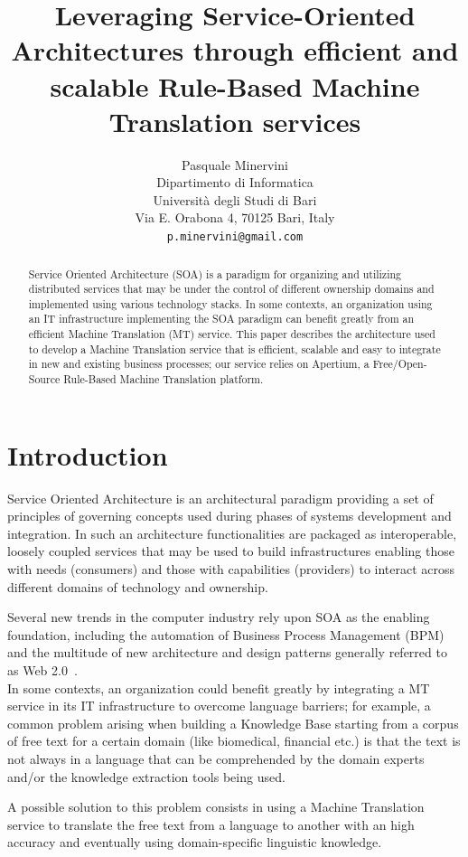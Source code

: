 \documentclass[11pt]{article}
\title{Leveraging Service-Oriented Architectures through efficient and scalable Rule-Based Machine Translation services}
\author{Pasquale Minervini\\
  Dipartimento di Informatica\\
  Università degli Studi di Bari\\
  Via E. Orabona 4, 70125 Bari, Italy\\
  {\tt p.minervini@gmail.com}}
\date{}
\begin{document}
\maketitle

\begin{abstract}
Service Oriented Architecture (SOA) is a paradigm for organizing and utilizing distributed services that may be under the  control of different ownership domains and implemented using various technology stacks. In some contexts, an organization using an IT infrastructure implementing the SOA paradigm can benefit greatly from an efficient Machine Translation (MT) service. This paper describes the architecture used to develop a Machine Translation service that is efficient, scalable and easy to integrate in new and existing business processes; our service relies on Apertium, a Free/Open-Source Rule-Based Machine Translation platform.
\end{abstract}


\section{Introduction}

Service Oriented Architecture is an architectural paradigm providing  a set of principles of governing concepts used during phases of systems development and integration. In such an architecture functionalities are packaged as interoperable, loosely coupled services that may be used to build infrastructures enabling those with needs (consumers) and those with capabilities (providers) to interact across different domains of technology and ownership.

Several new trends in the computer industry rely upon SOA as the enabling foundation, including the automation of Business Process Management (BPM) and the multitude of new architecture and design patterns generally referred to as Web 2.0~\citep{web20}.\\

In some contexts, an organization could benefit greatly by integrating a MT service in its IT infrastructure to overcome language barriers; for example, a common problem arising when building a Knowledge Base starting from a corpus of free text for a certain domain (like biomedical, financial etc.) is that the text is not always in a language that can be comprehended by the domain experts and/or the knowledge extraction tools being used.

A possible solution to this problem consists in using a Machine Translation service to translate the free text from a language to another with an high accuracy and eventually using domain-specific linguistic knowledge.\\
\end{document}
